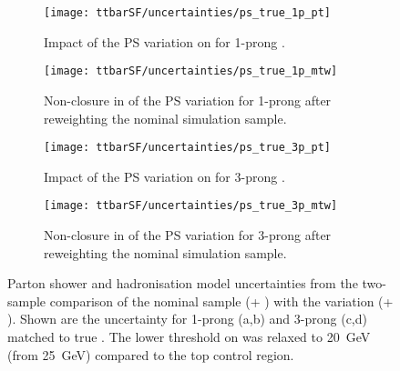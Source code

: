 \begin{figure}[htbp]
  \centering

  \begin{subfigure}[t]{.48\textwidth}
    \texttt{[image: ttbarSF/uncertainties/ps\_true\_1p\_pt]}
    \caption{Impact of the PS variation on \tauhadvis \pT for 1-prong
      \tauhadvis.}
    \label{fig:ttbarSF_uncertainty_ps_1p_pt}
  \end{subfigure}\hfill%
  \begin{subfigure}[t]{.48\textwidth}
    \texttt{[image: ttbarSF/uncertainties/ps\_true\_1p\_mtw]}
    \caption{Non-closure in \mTW of the PS variation for 1-prong
      \tauhadvis after reweighting the nominal simulation sample.}
    \label{fig:ttbarSF_uncertainty_ps_1p_mtw}
  \end{subfigure}

  \vspace{0.5em}

  \begin{subfigure}[t]{.48\textwidth}
    \texttt{[image: ttbarSF/uncertainties/ps\_true\_3p\_pt]}
    \caption{Impact of the PS variation on \tauhadvis \pT for 3-prong
      \tauhadvis.}
    \label{fig:ttbarSF_uncertainty_ps_3p_pt}
  \end{subfigure}\hfill%
  \begin{subfigure}[t]{.48\textwidth}
    \texttt{[image: ttbarSF/uncertainties/ps\_true\_3p\_mtw]}
    \caption{Non-closure in \mTW of the PS variation for 3-prong
      \tauhadvis after reweighting the nominal simulation sample.}
    \label{fig:ttbarSF_uncertainty_ps_3p_mtw}
  \end{subfigure}

  \caption{Parton shower and hadronisation model uncertainties from
    the two-sample comparison of the nominal sample (\POWHEGBOX[v2] +
    \PYTHIA[8]) with the variation (\POWHEGBOX[v2] +
    \HERWIG[7]). Shown are the uncertainty for 1-prong (a,b) and
    3-prong (c,d) \tauhadvis matched to true \tauhad. The lower
    threshold on \tauhadvis \pT was relaxed to \SI{20}{\GeV} (from
    \SI{25}{\GeV}) compared to the top control region.}
  \label{fig:ttbarSF_uncertainty_ps}
\end{figure}



